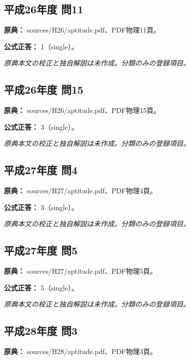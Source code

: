 \subsection{平成26年度 問11}
\label{q:h26-reg-apt-11}

\noindent\textbf{原典：} sources/H26/aptitude.pdf、PDF物理11頁。

\textbf{公式正答：} 1（single）。

\par\textit{原典本文の校正と独自解説は未作成。分類のみの登録項目。}

\subsection{平成26年度 問15}
\label{q:h26-reg-apt-15}

\noindent\textbf{原典：} sources/H26/aptitude.pdf、PDF物理15頁。

\textbf{公式正答：} 3（single）。

\par\textit{原典本文の校正と独自解説は未作成。分類のみの登録項目。}

\subsection{平成27年度 問4}
\label{q:h27-reg-apt-04}

\noindent\textbf{原典：} sources/H27/aptitude.pdf、PDF物理4頁。

\textbf{公式正答：} 3（single）。

\par\textit{原典本文の校正と独自解説は未作成。分類のみの登録項目。}

\subsection{平成27年度 問5}
\label{q:h27-reg-apt-05}

\noindent\textbf{原典：} sources/H27/aptitude.pdf、PDF物理5頁。

\textbf{公式正答：} 5（single）。

\par\textit{原典本文の校正と独自解説は未作成。分類のみの登録項目。}

\subsection{平成28年度 問3}
\label{q:h28-reg-apt-03}

\noindent\textbf{原典：} sources/H28/aptitude.pdf、PDF物理3頁。

